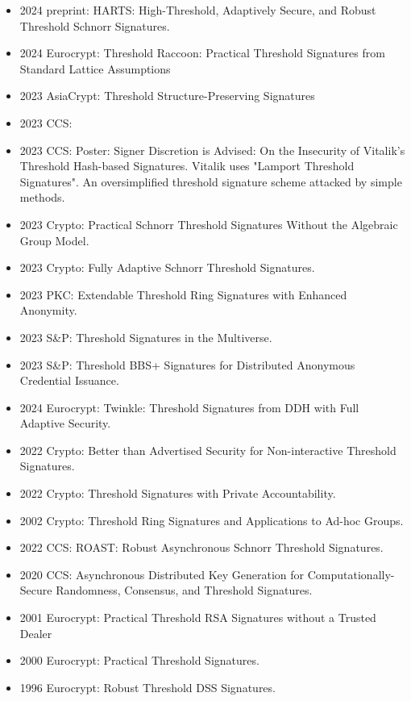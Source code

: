 \begin{itemize}
    \item 2024 preprint: HARTS: High-Threshold, Adaptively Secure, and Robust Threshold Schnorr Signatures. 
    \item 2024 Eurocrypt: Threshold Raccoon: Practical Threshold Signatures from Standard Lattice Assumptions
    \item 2023 AsiaCrypt: Threshold Structure-Preserving Signatures 
    \item 2023 CCS: \cite{DBLP:conf/ccs/DasCXNB023}
    \item 2023 CCS: Poster: Signer Discretion is Advised: On the Insecurity of Vitalik's Threshold Hash-based Signatures. Vitalik uses "Lamport Threshold Signatures". An oversimplified threshold signature scheme attacked by simple methods. 
    \item 2023 Crypto: Practical Schnorr Threshold Signatures Without the Algebraic Group Model. 
    \item 2023 Crypto: Fully Adaptive Schnorr Threshold Signatures.
    \item 2023 PKC: Extendable Threshold Ring Signatures with Enhanced Anonymity. 
    \item 2023 S\&P: Threshold Signatures in the Multiverse. 
    \item 2023 S\&P: Threshold BBS+ Signatures for Distributed Anonymous Credential Issuance. 
    \item 2024 Eurocrypt: Twinkle: Threshold Signatures from DDH with Full Adaptive Security. 
    \item 2022 Crypto: Better than Advertised Security for Non-interactive Threshold Signatures. 
    \item 2022 Crypto: Threshold Signatures with Private Accountability. 
    \item 2002 Crypto: Threshold Ring Signatures and Applications to Ad-hoc Groups. 
    \item 2022 CCS: ROAST: Robust Asynchronous Schnorr Threshold Signatures. 
    \item 2020 CCS: Asynchronous Distributed Key Generation for Computationally-Secure Randomness, Consensus, and Threshold Signatures. 
    \item 2001 Eurocrypt: Practical Threshold RSA Signatures without a Trusted Dealer
    \item 2000 Eurocrypt: Practical Threshold Signatures. 
    \item 1996 Eurocrypt: Robust Threshold DSS Signatures. 
\end{itemize}

